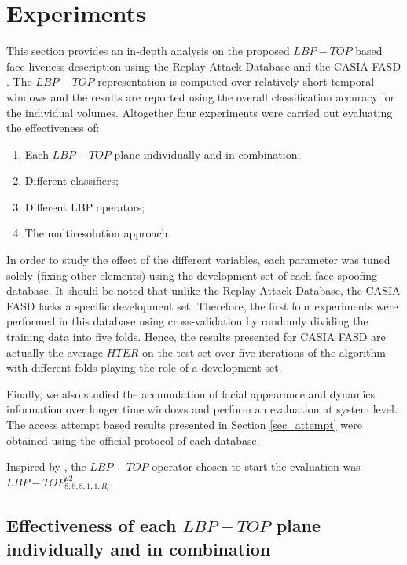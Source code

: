 \section{Experiments}
\label{sec_experiments}

This section provides an in-depth analysis on the proposed $LBP-TOP$ based face liveness description using the Replay Attack Database \cite{ChingovskaBIOSIG2012} and the CASIA FASD \cite{zhangface}. The $LBP-TOP$ representation is computed over relatively short temporal windows and the results are reported using the overall classification accuracy for the individual volumes. Altogether four experiments were carried out evaluating the effectiveness of:

\begin{enumerate}
        \item Each $LBP-TOP$ plane individually and in combination;
        \item Different classifiers;
        \item Different LBP operators;
        \item The multiresolution approach.
\end{enumerate}

In order to study the effect of the different variables, each parameter was tuned solely (fixing other elements) using the development set of each face spoofing database. It should be noted that unlike the Replay Attack Database, the CASIA FASD lacks a specific development set. Therefore, the first four experiments were performed in this database using cross-validation by randomly dividing the training data into five folds. Hence, the results presented for CASIA FASD are actually the average $HTER$ on the test set over five iterations of the algorithm with different folds playing the role of a development set.

Finally, we also studied the accumulation of facial appearance and dynamics information over longer time windows and perform an evaluation at system level. The access attempt based results presented in Section \ref{sec_attempt} were obtained using the official protocol of each database.

Inspired by \cite{ChingovskaBIOSIG2012}, the $LBP-TOP$ operator chosen to start the evaluation was $LBP-TOP_{8,8,8,1,1,R_{t}}^{u2}$. 

\subsection{Effectiveness of each $LBP-TOP$ plane individually and in combination}
\label{sec_lbptop_planes}

